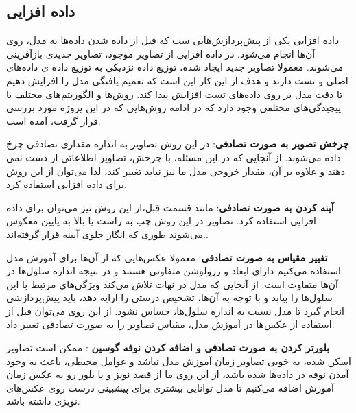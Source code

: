 \subsection{داده افزایی}\label{subsec:داده-افزایی}

داده افزایی یکی از پیش‌پردازش‌هایی ست که قبل از داده شدن داده‌ها به مدل، روی آن‌ها انجام می‌شود.
در داده افزایی از تصاویر موجود، تصاویر جدیدی بازآفرینی می‌شوند.
معمولا تصاویر جدید ایجاد شده، توزیع داده نزدیکی به توزیع داده ی داده‌های اصلی و تست دارند و هدف از این کار این است که تعمیم یافتگی مدل را افزایش دهیم تا دقت مدل بر روی داده‌های تست افزایش پیدا کند.
روش‌ها و الگوریتم‌های مختلف با پیچیدگی‌های مختلفی وجود دارد که در ادامه روش‌هایی که در این پروژه مورد بررسی قرار گرفت، آمده است.

\textbf{چرخش تصویر به صورت تصادفی}:
در این روش تصاویر به اندازه مقداری تصادفی چرخ داده می‌شوند.
از آنجایی که در این مسئله، با چرخش، تصاویر اطلاعاتی از دست نمی دهند و علاوه بر آن، مقدار خروجی مدل ما نیز نباید تغییر کند، لذا می‌توان از این روش برای داده افزایی استفاده کرد.

\textbf{آینه کردن به صورت تصادفی}:
مانند قسمت قبل،از این روش نیز می‌توان برای داده افزایی استفاده کرد. تصاویر در این روش چپ به راست یا بالا به پایین معکوس می‌شوند طوری که انگار جلوی آیینه قرار گرفته‌اند..

\textbf{تغییر مقیاس به صورت تصادفی}:
معمولا عکس‌هایی که از آن‌ها برای آموزش مدل استفاده می‌کنیم دارای ابعاد و رزولوشن متفاوتی هستند و در نتیجه اندازه سلول‌ها در آن‌ها متفاوت است.
از آنجایی که مدل در نهات تلاش می‌کند ویژگی‌های مرتبط با این سلول‌ها را بیابد و با توجه به آن‌ها، تشخیص درستی را ارایه دهد، باید پیش‌پردازشی انجام گیرد تا مدل نسبت به اندازه سلول‌ها، حساس نشود. از این روی می‌توان قبل از استفاده از عکس‌ها در آموزش مدل، مقیاس تصاویر را به صورت تصادفی تغییر داد.

\textbf{بلورتر کردن به صورت تصادفی و اضافه کردن نوفه گوسین }:
ممکن است تصاویر اسکن شده، به خوبی تصاویر زمان آموزش مدل نباشد و عوامل محیطی، باعث به وجود آمدن نوفه در داده‌ها شده باشد، از این روی ما از قصد نویز و یا بلور رو به عکس زمان آموزش اضافه می‌کنیم تا مدل توانایی بیشتری برای پیشبینی درست روی عکس‌های نویزی داشته باشد.

